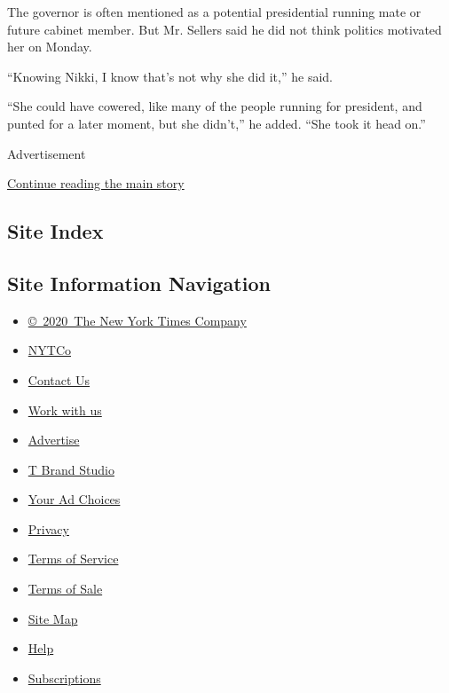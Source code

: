 The governor is often mentioned as a potential presidential running mate
or future cabinet member. But Mr. Sellers said he did not think politics
motivated her on Monday.

``Knowing Nikki, I know that's not why she did it,'' he said.

``She could have cowered, like many of the people running for president,
and punted for a later moment, but she didn't,'' he added. ``She took it
head on.''

Advertisement

\protect\hyperlink{after-bottom}{Continue reading the main story}

\hypertarget{site-index}{%
\subsection{Site Index}\label{site-index}}

\hypertarget{site-information-navigation}{%
\subsection{Site Information
Navigation}\label{site-information-navigation}}

\begin{itemize}
\tightlist
\item
  \href{https://help.nytimes.com/hc/en-us/articles/115014792127-Copyright-notice}{©~2020~The
  New York Times Company}
\end{itemize}

\begin{itemize}
\tightlist
\item
  \href{https://www.nytco.com/}{NYTCo}
\item
  \href{https://help.nytimes.com/hc/en-us/articles/115015385887-Contact-Us}{Contact
  Us}
\item
  \href{https://www.nytco.com/careers/}{Work with us}
\item
  \href{https://nytmediakit.com/}{Advertise}
\item
  \href{http://www.tbrandstudio.com/}{T Brand Studio}
\item
  \href{https://www.nytimes.com/privacy/cookie-policy\#how-do-i-manage-trackers}{Your
  Ad Choices}
\item
  \href{https://www.nytimes.com/privacy}{Privacy}
\item
  \href{https://help.nytimes.com/hc/en-us/articles/115014893428-Terms-of-service}{Terms
  of Service}
\item
  \href{https://help.nytimes.com/hc/en-us/articles/115014893968-Terms-of-sale}{Terms
  of Sale}
\item
  \href{https://spiderbites.nytimes.com}{Site Map}
\item
  \href{https://help.nytimes.com/hc/en-us}{Help}
\item
  \href{https://www.nytimes.com/subscription?campaignId=37WXW}{Subscriptions}
\end{itemize}
